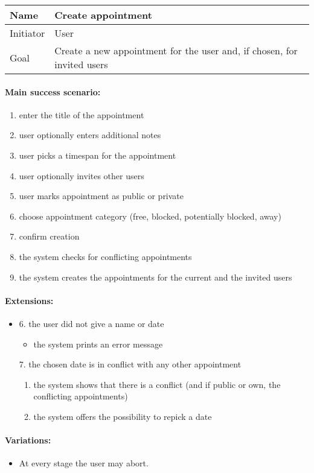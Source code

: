 \documentclass[a4paper]{scrartcl}
\begin{document}
\begin{tabular}{|g|l|}
	\hline
Name &  Create appointment \\
	\hline
Initiator &  User \\
	\hline
Goal &  Create a new appointment for the user and, if chosen, for invited users \\
	\hline
\end{tabular}

\paragraph{Main success scenario:}
\begin{enumerate}
	\item enter the title of the appointment
  \item user optionally enters additional notes 
	\item user picks a timespan for the appointment
	\item user optionally invites other users
	\item user marks appointment as public or private
	\item choose appointment category (free, blocked, potentially blocked, away)
	\item confirm creation
	\item the system checks for conflicting appointments
	\item the system creates the appointments for the current and the invited users
\end{enumerate}

\paragraph{Extensions:}
\begin{itemize}
	\item 6. the user did not give a name or date
		\begin{itemize}
			\item the system prints an error message
		\end{itemize}
    	\item[7.] the chosen date is in conflict with any other appointment
				\begin{enumerate}
					\item the system shows that there is a conflict (and if public or own, the conflicting appointments)
					\item the system offers the possibility to repick a date
				\end{enumerate}
\end{itemize}

\paragraph{Variations:}
\begin{itemize} 
	\item At every stage the user may abort.
\end{itemize}
\end{document}
